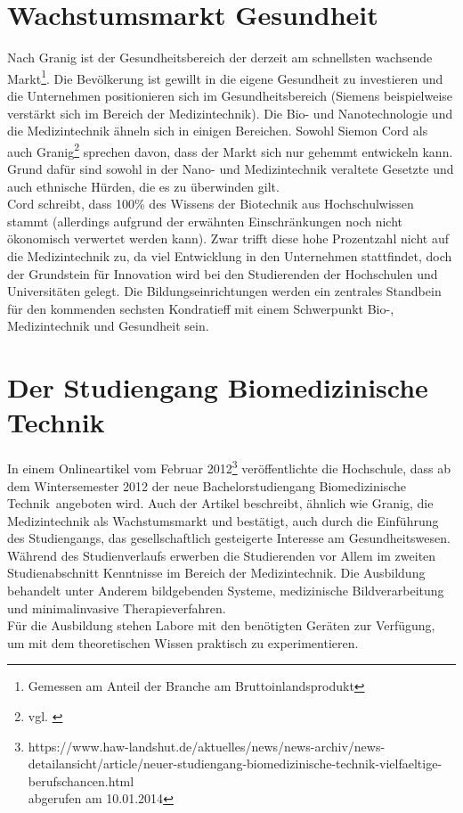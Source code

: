 \section{Wachstumsmarkt Gesundheit}

Nach Granig\cite{nefiodow:gesundheit} ist der Gesundheitsbereich der derzeit am schnellsten wachsende Markt\footnote{Gemessen am Anteil der Branche am Bruttoinlandsprodukt}. Die Bevölkerung ist gewillt in die eigene Gesundheit zu investieren und die Unternehmen positionieren sich im Gesundheitsbereich (Siemens beispielweise verstärkt sich im Bereich der Medizintechnik).
Die Bio- und Nanotechnologie und die Medizintechnik ähneln sich in einigen Bereichen. Sowohl Siemon Cord \cite{cord:innovation} als auch Granig\footnote{vgl. \cite[Seite 116 f]{nefiodow:gesundheit} } sprechen davon, dass der Markt sich nur gehemmt entwickeln kann. Grund dafür sind sowohl in der Nano- und Medizintechnik veraltete Gesetzte und auch ethnische Hürden, die es zu überwinden gilt.\\
Cord schreibt, dass 100\% des Wissens der Biotechnik aus Hochschulwissen stammt (allerdings aufgrund der erwähnten Einschränkungen noch nicht ökonomisch verwertet werden kann). Zwar trifft diese hohe Prozentzahl nicht auf die Medizintechnik zu, da viel Entwicklung in den Unternehmen stattfindet, doch der Grundstein für Innovation wird bei den Studierenden der Hochschulen und Universitäten gelegt. Die Bildungseinrichtungen werden ein zentrales Standbein für den kommenden sechsten Kondratieff mit einem Schwerpunkt Bio-, Medizintechnik und Gesundheit sein.

\section{Der Studiengang Biomedizinische Technik}\label{einleitung:biomedTechnik}
In einem Onlineartikel vom Februar 2012\footnote{https://www.haw-landshut.de/aktuelles/news/news-archiv/news-detailansicht/article/neuer-studiengang-biomedizinische-technik-vielfaeltige-berufschancen.html \\ abgerufen am 10.01.2014} veröffentlichte die Hochschule, dass ab dem Wintersemester 2012 der neue Bachelorstudiengang \glqq Biomedizinische Technik\grqq\ angeboten wird. Auch der Artikel beschreibt, ähnlich wie Granig, die Medizintechnik als Wachstumsmarkt und bestätigt, auch durch die Einführung des Studiengangs, das gesellschaftlich gesteigerte Interesse am Gesundheitswesen.\\
Während des Studienverlaufs \cite{hsla:modulBMT} erwerben die Studierenden vor Allem im zweiten Studienabschnitt Kenntnisse im Bereich der Medizintechnik. Die Ausbildung behandelt unter Anderem bildgebenden Systeme, medizinische Bildverarbeitung und minimalinvasive Therapieverfahren.\\
Für die Ausbildung stehen Labore mit den benötigten Geräten zur Verfügung, um mit dem theoretischen Wissen praktisch zu experimentieren.

